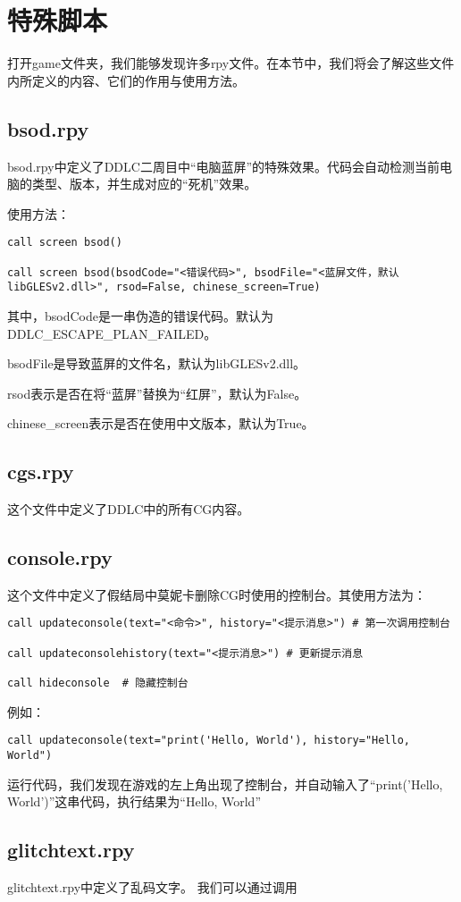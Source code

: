 \section{特殊脚本}

打开game文件夹，我们能够发现许多rpy文件。在本节中，我们将会了解这些文件内所定义的内容、它们的作用与使用方法。

\subsection{bsod.rpy}

bsod.rpy中定义了DDLC二周目中“电脑蓝屏”的特殊效果。代码会自动检测当前电脑的类型、版本，并生成对应的“死机”效果。

使用方法：
\begin{lstlisting}
call screen bsod()

call screen bsod(bsodCode="<错误代码>", bsodFile="<蓝屏文件，默认libGLESv2.dll>", rsod=False, chinese_screen=True)
\end{lstlisting}

其中，bsodCode是一串伪造的错误代码。默认为DDLC\_ESCAPE\_PLAN\_FAILED。


bsodFile是导致蓝屏的文件名，默认为libGLESv2.dll。


rsod表示是否在将“蓝屏”替换为“红屏”，默认为False。


chinese\_screen表示是否在使用中文版本，默认为True。


\subsection{cgs.rpy}

这个文件中定义了DDLC中的所有CG内容。


\subsection{console.rpy}

这个文件中定义了假结局中莫妮卡删除CG时使用的控制台。其使用方法为：
\begin{lstlisting}
call updateconsole(text="<命令>", history="<提示消息>") # 第一次调用控制台

call updateconsolehistory(text="<提示消息>") # 更新提示消息

call hideconsole  # 隐藏控制台
\end{lstlisting}

例如：
\begin{lstlisting}
call updateconsole(text="print('Hello, World'), history="Hello, World")
\end{lstlisting}

运行代码，我们发现在游戏的左上角出现了控制台，并自动输入了“print('Hello, World')”这串代码，执行结果为“Hello, World”

\subsection{glitchtext.rpy}

glitchtext.rpy中定义了乱码文字。
我们可以通过调用